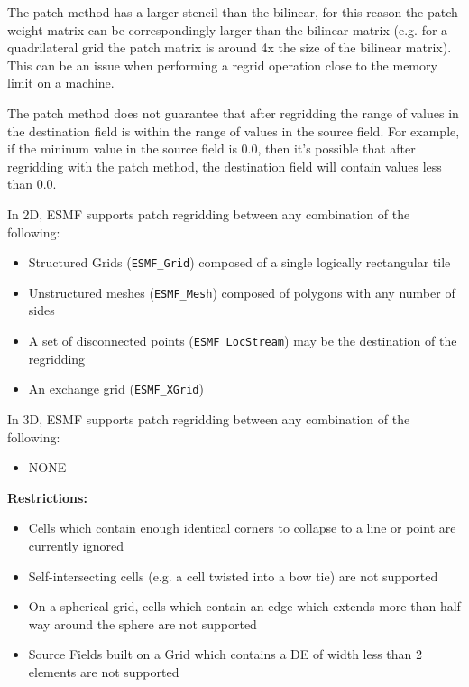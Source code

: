  The patch method has a larger stencil than the bilinear, for this reason the patch weight matrix can be correspondingly larger
 than the bilinear matrix (e.g. for a quadrilateral grid the patch matrix is around 4x the size of
 the bilinear matrix). This can be an issue when performing a regrid operation close to the memory
 limit on a machine. 

  The patch method does not guarantee that after regridding the range of values in the destination field is within the range of 
 values in the source field. For example, if the mininum value in the source field is 0.0, then it's possible that after regridding with the 
 patch method, the destination field will contain values less than 0.0.

\smallskip

 In 2D, ESMF supports patch regridding between any combination of the following:
 \begin{itemize}
 \item Structured Grids ({\tt ESMF\_Grid}) composed of a single logically rectangular tile
 \item Unstructured meshes ({\tt ESMF\_Mesh}) composed of polygons with any number of sides
 \item A set of disconnected points ({\tt ESMF\_LocStream}) may be the destination of the regridding
 \item An exchange grid ({\tt ESMF\_XGrid})
 \end{itemize}

\smallskip

 In 3D, ESMF supports patch regridding between any combination of the following:
 \begin{itemize}
 \item NONE
 \end{itemize}

\smallskip

{\bf Restrictions:}
 \begin{itemize}
 \item Cells which contain enough identical corners to collapse to a line or point are currently ignored
 \item Self-intersecting cells (e.g. a cell twisted into a bow tie) are not supported
 \item On a spherical grid, cells which contain an edge which extends more than half way around the sphere are not supported 
 \item Source Fields built on a Grid which contains a DE of width less than 2 elements are not supported
 \end{itemize}

